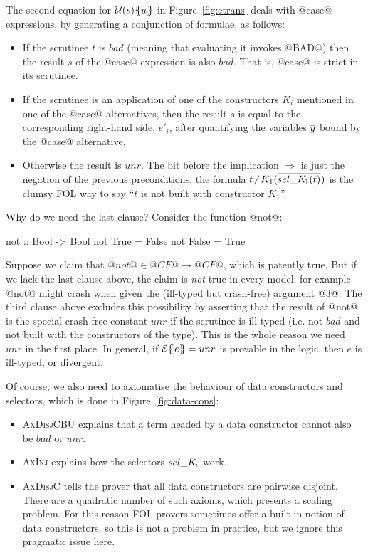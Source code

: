 The second equation for $\utrans{}{u}{s}$ in Figure~\ref{fig:etrans} deals with
@case@ expressions, by generating a conjunction of formulae, as follows:
\begin{itemize}
\item If the scrutinee $t$ is $bad$ (meaning that evaluating it invokes @BAD@) then
the result $s$ of the @case@ expression is also $bad$.  That is, @case@ is strict in
its scrutinee.
\item If the scrutinee is an application of one of the constructors $K_i$ mentioned
in one of the @case@ alternatives, then the result $s$ is equal to the corresponding
right-hand side, $e'_i$, after quantifying the variables $\ol{y}$ bound by the @case@ alternative.
\item Otherwise the result is $unr$.
The bit before the implication $\Rightarrow$ is just the
negation of the previous preconditions; the formula
  $t{\neq}K_1(\oln{{\sel{K}{1}}(t)}{})$
is the clumsy FOL way to say ``$t$ is not built with constructor $K_1$''.
\end{itemize}
Why do we need the last clause? Consider the function @not@:
\begin{code}
  not :: Bool -> Bool
  not True = False
  not False = True
\end{code}
Suppose we claim that $@not@ \in @CF@ \rightarrow @CF@$, which is patently true.
But if we lack the last clause above, the claim 
is \emph{not} true in every model;
for example @not@ might crash when given the (ill-typed but crash-free) 
argument @3@.  The third clause above excludes this possibility by
asserting that the result of @not@ is the special crash-free constant $unr$
if the scrutinee is ill-typed (i.e. not $bad$ and not built with the 
constructors of the type).  This is the whole reason we need $unr$ in the first place.
In general, if $\etrans{}{}{e} = unr$ is provable in the logic, then $e$ is ill-typed, 
or divergent.

Of course, we also need to axiomatise the behaviour of data constructors and
selectors, which is done in Figure~\ref{fig:data-cons}:
\begin{itemize}
\item \textsc{AxDisjCBU} explains that a term headed by a data constructor cannot
also be $bad$ or $unr$.
\item \textsc{AxInj} explains how the selectors $\sel{K}{i}$ work.
\item \textsc{AxDisjC} tells the prover that all data constructors are pairwise disjoint.
There are a quadratic number of such axioms, which presents a scaling problem.
For this reason FOL provers sometimes offer a built-in notion of data constructors,
so this is not a problem in practice, but we ignore this pragmatic issue here.
\end{itemize}


